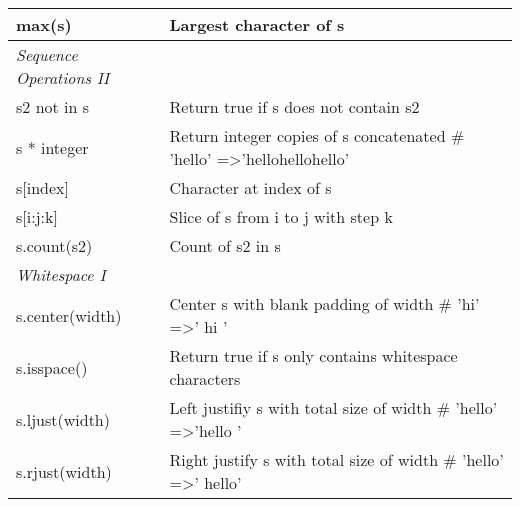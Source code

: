 \documentclass[a4paper,11pt]{book}
\numberwithin{figure}{chapter}
\numberwithin{table}{chapter}
\begin{document}
\begin{appendices}
\begin{table}[!htbp]
\begin{tabular}{lp{12cm}}
max(s)                   & Largest character of s                                                                                                                          \\ \midrule 
\textit{Sequence Operations II}   &                                                                                                                                                 \\ \midrule
s2 not in s              & Return true if s does not contain s2                                                                                                            \\
s * integer              & Return integer copies of s concatenated \# 'hello' =\textgreater 'hellohellohello'                                                              \\
s{[}index{]}             & Character at index of s                                                                                                                         \\
s{[}i:j:k{]}             & Slice of s from i to j with step k                                                                                                              \\
s.count(s2)              & Count of s2 in s                                                                                                                                \\ \midrule
\textit{Whitespace I}             &                                                                                                                                                 \\ \midrule
s.center(width)          & Center s with blank padding of width \# 'hi' =\textgreater ' hi '                                                                               \\
s.isspace()              & Return true if s only contains whitespace characters                                                                                            \\
s.ljust(width)           & Left justifiy s with total size of width \# 'hello' =\textgreater 'hello '                                                                      \\
s.rjust(width)           & Right justify s with total size of width \# 'hello' =\textgreater ' hello'                                                                      \\

\end{tabular}
\end{table}
\end{appendices}
\end{document}
